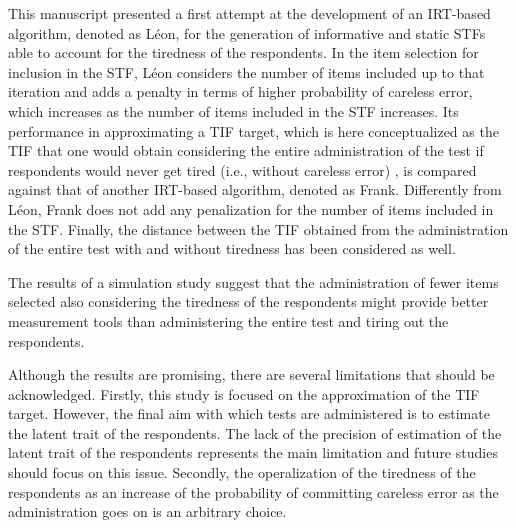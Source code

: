 \documentclass{svproc}
\begin{document}
This manuscript presented a first attempt at the development of an IRT-based algorithm, denoted as Léon, for the generation of informative and static STFs able to account for the tiredness of the respondents. In the item selection for inclusion in the STF, Léon considers the number of items included up to that iteration and adds a penalty in terms of higher probability of careless error, which increases as the number of items included in the STF increases. Its performance in approximating a TIF target, which is here conceptualized as the TIF that one would obtain considering the entire administration of the test if respondents would never get tired (i.e., without careless error) , is compared against that of another IRT-based algorithm, denoted as Frank. Differently from Léon, Frank does not add any penalization for the number of items included in the STF. Finally, the distance between the TIF obtained from the administration of the entire test with and without tiredness has been considered as well. 

The results of a simulation study suggest that the administration of fewer items selected also considering the tiredness of the respondents might provide better measurement tools  than administering the entire test and tiring out the respondents. 

Although the results are promising, there are several limitations that should be acknowledged. Firstly, this study is focused on the approximation of the TIF target. However, the final aim with which tests are administered is to estimate the latent trait of the respondents. The lack of the precision of estimation of the latent trait of the respondents represents the main limitation and future studies should focus on this issue. 
Secondly, the operalization of the tiredness of the respondents as an increase of the probability of committing careless error as the administration goes on is an arbitrary choice.
\end{document}
